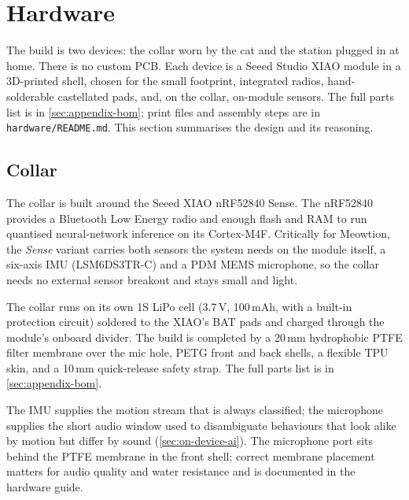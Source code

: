 \section{Hardware}
\label{sec:hardware}

The build is two devices: the collar worn by the cat and the station plugged in at home. There is no
custom PCB. Each device is a Seeed Studio XIAO module in a 3D-printed shell, chosen for the small
footprint, integrated radios, hand-solderable castellated pads, and, on the collar, on-module
sensors. The full parts list is in \cref{sec:appendix-bom}; print files and assembly steps are in
\texttt{hardware/README.md}. This section summarises the design and its reasoning.

\subsection{Collar}

The collar is built around the Seeed XIAO nRF52840 Sense. The nRF52840 provides a Bluetooth Low
Energy radio and enough flash and RAM to run quantised neural-network inference on its Cortex-M4F.
Critically for Meowtion, the \emph{Sense} variant carries both sensors the system needs on the module
itself, a six-axis IMU (LSM6DS3TR-C) and a PDM MEMS microphone, so the collar needs no external
sensor breakout and stays small and light.

The collar runs on its own 1S LiPo cell (3.7\,V, 100\,mAh, with a built-in protection circuit)
soldered to the XIAO's BAT pads and charged through the module's onboard divider. The build is
completed by a 20\,mm hydrophobic PTFE filter membrane over the mic hole, PETG front and back shells,
a flexible TPU skin, and a 10\,mm quick-release safety strap. The full parts list is in
\cref{sec:appendix-bom}.

The IMU supplies the motion stream that is always classified; the microphone supplies the short audio
window used to disambiguate behaviours that look alike by motion but differ by sound
(\cref{sec:on-device-ai}). The microphone port sits behind the PTFE membrane in the front shell;
correct membrane placement matters for audio quality and water resistance and is documented in the
hardware guide.

